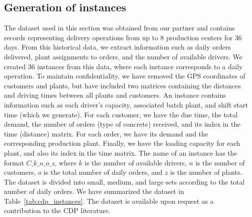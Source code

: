 \subsection{Generation of instances}
\newcommand{\nbInstance}{36}
The dataset used in this section was obtained from our partner and contains records representing delivery operations from up to 8 production centers for $\nbInstance$ days. From this historical data, we extract information such as daily orders delivered, plant assignments to orders, and the number of available drivers. We created $\nbInstance$ instances from this data, where each instance corresponds to a daily operation. To maintain confidentiality, we have removed the GPS coordinates of customers and plants, but have included two matrices containing the distances and driving times between all plants and customers. An instance contains information such as each driver's capacity, associated batch plant, and shift start time (which we generate). For each customer, we have the due time, the total demand, the number of orders (type of concrete) received, and its index in the time (distance) matrix. For each order, we have its demand and the corresponding production plant. Finally, we have the loading capacity for each plant, and also its index in the time matrix. The name of an instance has the format $C\_k\_n\_o\_z$, where $k$ is the number of available drivers, $n$ is the number of customers, $o$ is the total number of daily orders, and $z$ is the number of plants. The dataset is divided into small, medium, and large sets according to the total number of daily orders. We have summarized the dataset in Table~\ref{tab:cdp_instances}. The dataset is available upon request as a contribution to the CDP literature.

\begin{table}[htpb]
    \centering
    \caption{Instances summary}
    \label{tab:cdp_instances}
    \small
\end{table}

